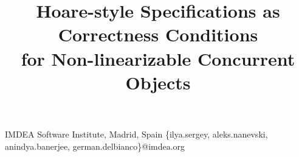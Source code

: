 \documentclass[preprint,9pt,nocopyrightspace]{sigplanconf}
\begin{document}


{IMDEA Software Institute, Madrid, Spain}
{
\{ilya.sergey, aleks.nanevski, anindya.banerjee,
  german.delbianco\}@imdea.org 
}








\title{
  Hoare-style Specifications as Correctness Conditions\\
  for Non-linearizable Concurrent Objects
% 
}
 

\maketitle
\end{document}
